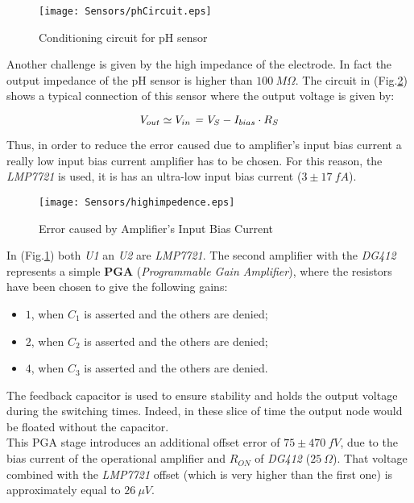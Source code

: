 \begin{figure}[h]
	\centering
	\texttt{[image: Sensors/phCircuit.eps]}
	\caption{Conditioning circuit for pH sensor}
	\label{Fig:circuitph}
	
\end{figure}

Another challenge is given by the high impedance of the electrode. In fact the output impedance of the pH sensor is higher than $100\ M\Omega$. The circuit in (Fig.\ref{Fig:high}) shows a typical connection of this sensor where the output voltage is given by:

\begin{equation}
V_{out} \simeq V_{in} \text{ \textit{=} } V_{S} - I_{bias} \cdot R_{S}
\end{equation}

Thus, in order to reduce the error caused due to amplifier's input bias current a really low input bias current amplifier has to be chosen. For this reason, the 
\textit{LMP7721} is used, it is has an ultra-low input bias current ($3 \pm 17\ fA$).\\


\begin{figure}[h]
	\centering
	\texttt{[image: Sensors/highimpedence.eps]}
	\caption{Error caused by Amplifier's Input Bias Current}
	\label{Fig:high}
	
\end{figure}

In (Fig.\ref{Fig:circuitph}) both \textit{U1} an \textit{U2} are \textit{LMP7721}. The second amplifier with the \textit{DG412} represents a simple \textbf{PGA} (\textit{Programmable Gain Amplifier}), where the resistors have been chosen to give the following gains:
\begin{itemize}
	\item $1$, when $C_1$ is asserted and the others are denied;
	\item $2$, when $C_2$ is asserted and the others are denied;
	\item $4$, when $C_3$ is asserted and the others are denied.
\end{itemize}

The feedback capacitor is used to ensure stability and holds the output voltage during the switching times. Indeed, in these slice of time the output node would be floated without the capacitor.\\
This PGA stage introduces an additional offset error of  $75 \pm 470\ fV$, due to the bias current of the operational amplifier and $R_{ON}$ of \textit{DG412} ($25\ \varOmega$). That voltage combined with the \textit{LMP7721} offset (which is very higher than the first one) is approximately equal to $26\ \mu V$.\\

